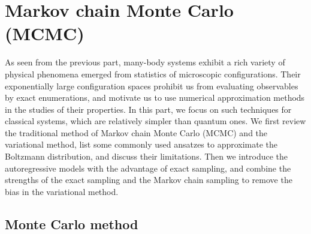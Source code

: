 \chapter{Markov chain Monte Carlo (MCMC)}
\label{ch:mcmc}

As seen from the previous part, many-body systems exhibit a rich variety of physical phenomena emerged from statistics of microscopic configurations. Their exponentially large configuration spaces prohibit us from evaluating observables by exact enumerations, and motivate us to use numerical approximation methods in the studies of their properties. In this part, we focus on such techniques for classical systems, which are relatively simpler than quantum ones. We first review the traditional method of Markov chain Monte Carlo (MCMC) and the variational method, list some commonly used ansatzes to approximate the Boltzmann distribution, and discuss their limitations. Then we introduce the autoregressive models with the advantage of exact sampling, and combine the strengths of the exact sampling and the Markov chain sampling to remove the bias in the variational method.

\section{Monte Carlo method}
\label{sec:monte-carlo}

